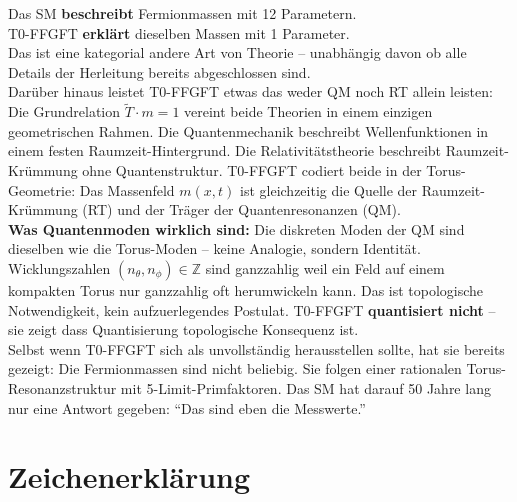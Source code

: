 \begin{predbox}
Das SM \textbf{beschreibt} Fermionmassen mit 12 Parametern.\\
T0-FFGFT \textbf{erklärt} dieselben Massen mit 1 Parameter.\\[4pt]
Das ist eine kategorial andere Art von Theorie -- unabhängig davon
ob alle Details der Herleitung bereits abgeschlossen sind.\\[4pt]
Darüber hinaus leistet T0-FFGFT etwas das weder QM noch RT
allein leisten: Die Grundrelation $\tilde{T} \cdot m = 1$ vereint
beide Theorien in einem einzigen geometrischen Rahmen.
Die Quantenmechanik beschreibt Wellenfunktionen in einem festen
Raumzeit-Hintergrund. Die Relativitätstheorie beschreibt
Raumzeit-Krümmung ohne Quantenstruktur. T0-FFGFT codiert beide
in der Torus-Geometrie: Das Massenfeld $m(x,t)$ ist gleichzeitig
die Quelle der Raumzeit-Krümmung (RT) und der Träger der
Quantenresonanzen (QM).\\[4pt]
\textbf{Was Quantenmoden wirklich sind:}
Die diskreten Moden der QM sind dieselben wie die Torus-Moden --
keine Analogie, sondern Identität. Wicklungszahlen
$(n_\theta, n_\phi) \in \mathbb{Z}$ sind ganzzahlig weil ein Feld
auf einem kompakten Torus nur ganzzahlig oft herumwickeln kann.
Das ist topologische Notwendigkeit, kein aufzuerlegendes Postulat.
T0-FFGFT \textbf{quantisiert nicht} -- sie zeigt dass Quantisierung
topologische Konsequenz ist.\\[4pt]
Selbst wenn T0-FFGFT sich als unvollständig herausstellen sollte,
hat sie bereits gezeigt: Die Fermionmassen sind nicht beliebig.
Sie folgen einer rationalen Torus-Resonanzstruktur mit
5-Limit-Primfaktoren. Das SM hat darauf 50 Jahre lang nur
eine Antwort gegeben: ``Das sind eben die Messwerte.''
\end{predbox}

\section*{Zeichenerklärung}

